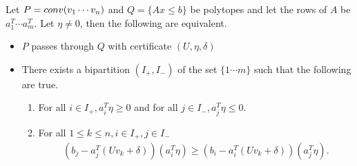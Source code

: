 \documentclass[10pt,a4paper]{amsart}
\begin{document}
\begin{thm} \label{thm:pass_through_simplified}
	Let $P=\textup{conv}(v_1 \cdots v_n)$ and $Q=\{Ax \leq b\}$ be polytopes and let the rows of $A$ be $a_1^T \cdots a_m^T$. Let $\eta \neq 0$, then the following are equivalent.
	\begin{itemize}
		\item $P$ passes through $Q$ with certificate $(U, \eta, \delta)$
		\item There exists a bipartition $(I_+, I_-)$ of the set $\{1 \cdots m\}$ such that the following are true.
		      \begin{enumerate}
		      	\item For all $i \in I_+, a_i^T \eta \geq 0$ and for all $j \in I_-, a_j^T \eta \leq 0$.
		      	\item For all $1 \leq k \leq n, i \in I_+, j \in I_-$
		      	      \begin{gather*}
		      	      	(b_j-a_j^T(Uv_k+\delta))(a_i^T\eta) \geq (b_i-a_i^T(Uv_k+\delta))(a_j^T\eta).
		      	      \end{gather*}
		      \end{enumerate}
	\end{itemize}
\end{thm}
\end{document}
